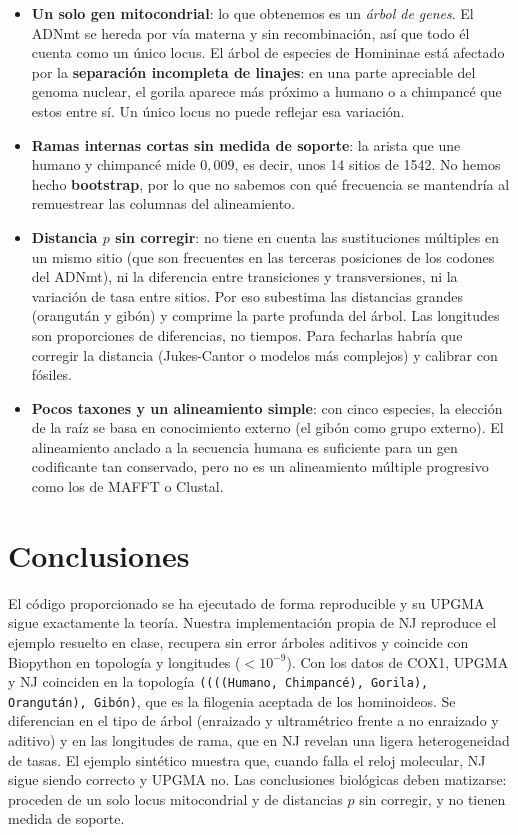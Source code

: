 \documentclass[10pt,a4paper]{article}
\begin{document}
\begin{itemize}
\item \textbf{Un solo gen mitocondrial}: lo que obtenemos es un \emph{árbol de genes}. El ADNmt se hereda por vía materna y sin recombinación, así que todo él cuenta como un único locus. El árbol de especies de Homininae está afectado por la \textbf{separación incompleta de linajes}: en una parte apreciable del genoma nuclear, el gorila aparece más próximo a humano o a chimpancé que estos entre sí. Un único locus no puede reflejar esa variación.
\item \textbf{Ramas internas cortas sin medida de soporte}: la arista que une humano y chimpancé mide $0{,}009$, es decir, unos 14 sitios de 1542. No hemos hecho \textbf{bootstrap}, por lo que no sabemos con qué frecuencia se mantendría al remuestrear las columnas del alineamiento.
\item \textbf{Distancia $p$ sin corregir}: no tiene en cuenta las sustituciones múltiples en un mismo sitio (que son frecuentes en las terceras posiciones de los codones del ADNmt), ni la diferencia entre transiciones y transversiones, ni la variación de tasa entre sitios. Por eso subestima las distancias grandes (orangután y gibón) y comprime la parte profunda del árbol. Las longitudes son proporciones de diferencias, no tiempos. Para fecharlas habría que corregir la distancia (Jukes-Cantor o modelos más complejos) y calibrar con fósiles.
\item \textbf{Pocos taxones y un alineamiento simple}: con cinco especies, la elección de la raíz se basa en conocimiento externo (el gibón como grupo externo). El alineamiento anclado a la secuencia humana es suficiente para un gen codificante tan conservado, pero no es un alineamiento múltiple progresivo como los de MAFFT o Clustal.
\end{itemize}

\section{Conclusiones}

El código proporcionado se ha ejecutado de forma reproducible y su UPGMA sigue exactamente la teoría. Nuestra implementación propia de NJ reproduce el ejemplo resuelto en clase, recupera sin error árboles aditivos y coincide con Biopython en topología y longitudes ($<10^{-9}$). Con los datos de COX1, UPGMA y NJ coinciden en la topología \texttt{((((Humano, Chimpancé), Gorila), Orangután), Gibón)}, que es la filogenia aceptada de los hominoideos. Se diferencian en el tipo de árbol (enraizado y ultramétrico frente a no enraizado y aditivo) y en las longitudes de rama, que en NJ revelan una ligera heterogeneidad de tasas. El ejemplo sintético muestra que, cuando falla el reloj molecular, NJ sigue siendo correcto y UPGMA no. Las conclusiones biológicas deben matizarse: proceden de un solo locus mitocondrial y de distancias $p$ sin corregir, y no tienen medida de soporte.
\end{document}
